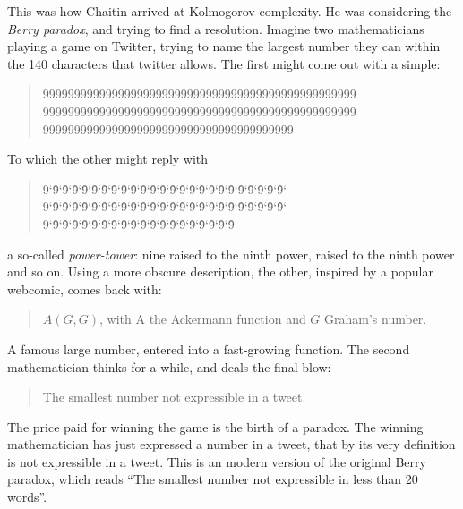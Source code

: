 This was how Chaitin arrived at Kolmogorov complexity. He was considering the \emph{Berry paradox}, and trying to find a resolution. Imagine two mathematicians playing a game on Twitter, trying to name the largest number they can within the 140 characters that twitter allows. The first might come out with a simple:
\begin{quote}
99999999999999999999999999999999999999999999999999\\ 99999999999999999999999999999999999999999999999999\\ 9999999999999999999999999999999999999999
\end{quote}
To which the other might reply with
\begin{quote}
9\char`\^9\char`\^9\char`\^9\char`\^9\char`\^9\char`\^9\char`\^9\char`\^9\char`\^9\char`\^9\char`\^9\char`\^9\char`\^9\char`\^9\char`\^9\char`\^9\char`\^9\char`\^9\char`\^9\char`\^9\char`\^9\char`\^9\char`\^9\char`\^9\char`\^ \\
9\char`\^9\char`\^9\char`\^9\char`\^9\char`\^9\char`\^9\char`\^9\char`\^9\char`\^9\char`\^9\char`\^9\char`\^9\char`\^9\char`\^9\char`\^9\char`\^9\char`\^9\char`\^9\char`\^9\char`\^9\char`\^9\char`\^9\char`\^9\char`\^9\char`\^ \\
9\char`\^9\char`\^9\char`\^9\char`\^9\char`\^9\char`\^9\char`\^9\char`\^9\char`\^9\char`\^9\char`\^9\char`\^9\char`\^9\char`\^9\char`\^9\char`\^9\char`\^9\char`\^9\char`\^9
\end{quote}
a so-called \emph{power-tower}: nine raised to the ninth power, raised to the ninth power and so on. Using a more obscure description, the other, inspired by a popular webcomic, \footnotemark comes back with:
\begin{quote}
$A(G, G)$, with A the Ackermann function and $G$ Graham's number.
\end{quote}
A famous large number, entered into a fast-growing function. The second mathematician thinks for a while, and deals the final blow:
\begin{quote}
The smallest number not expressible in a tweet.
\end{quote}
The price paid for winning the game is the birth of a paradox. The winning mathematician has just expressed a number in a tweet, that by its very definition is not expressible in a tweet. This is an modern version of the original Berry paradox, which reads ``The smallest number not expressible in less than 20 words''.


